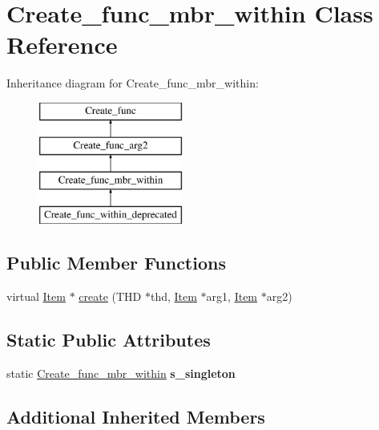 \hypertarget{classCreate__func__mbr__within}{}\section{Create\+\_\+func\+\_\+mbr\+\_\+within Class Reference}
\label{classCreate__func__mbr__within}
Inheritance diagram for Create\+\_\+func\+\_\+mbr\+\_\+within\+:\begin{figure}[H]
\begin{center}
\leavevmode
\includegraphics[height=4.000000cm]{classCreate__func__mbr__within}
\end{center}
\end{figure}
\subsection*{Public Member Functions}
\begin{DoxyCompactItemize}
\item 
virtual \mbox{\hyperlink{classItem}{Item}} $\ast$ \mbox{\hyperlink{classCreate__func__mbr__within_a72a9b14e94f6de6e154557f9bea81c82}{create}} (T\+HD $\ast$thd, \mbox{\hyperlink{classItem}{Item}} $\ast$arg1, \mbox{\hyperlink{classItem}{Item}} $\ast$arg2)
\end{DoxyCompactItemize}
\subsection*{Static Public Attributes}
\begin{DoxyCompactItemize}
\item 
\mbox{\label{classCreate__func__mbr__within_a417572539ba62451d22b6736d4943016}} 
static \mbox{\hyperlink{classCreate__func__mbr__within}{Create\+\_\+func\+\_\+mbr\+\_\+within}} {\bfseries s\+\_\+singleton}
\end{DoxyCompactItemize}
\subsection*{Additional Inherited Members}


